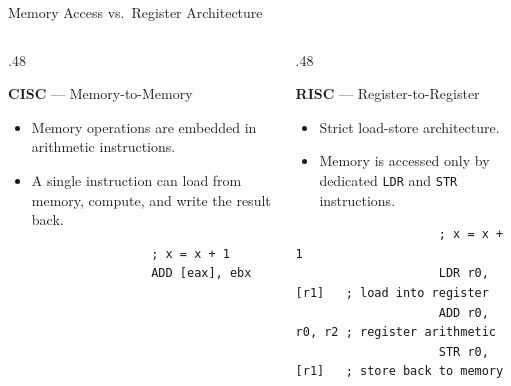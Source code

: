 \documentclass[9pt,aspectratio=169,xcolor=table]{beamer}
\begin{document}
\begin{frame}[fragile]{Memory Access vs.\ Register Architecture}
	\begin{columns}[T]
		\begin{column}{.48\textwidth}
			\begin{minipage}[t][.28\textheight][t]{\linewidth}
				\textbf{CISC} --- Memory-to-Memory
				\begin{itemize}
					\item Memory operations are embedded in arithmetic instructions.
					\item A single instruction can load from memory, compute, and write the result back.
				\end{itemize}
			\end{minipage}

			{\small\color{red!75!black}
				\begin{verbatim}
					; x = x + 1
					ADD [eax], ebx
			\end{verbatim}}
		\end{column}
		\begin{column}{.48\textwidth}
			\begin{minipage}[t][.28\textheight][t]{\linewidth}
				\textbf{RISC} --- Register-to-Register
				\begin{itemize}
					\item Strict load-store architecture.
					\item Memory is accessed only by dedicated \texttt{LDR} and \texttt{STR} instructions.
				\end{itemize}
			\end{minipage}

			{\small\color{red!75!black}
				\begin{verbatim}
					; x = x + 1
					LDR r0, [r1]   ; load into register
					ADD r0, r0, r2 ; register arithmetic
					STR r0, [r1]   ; store back to memory
			\end{verbatim}}
		\end{column}
	\end{columns}
\end{frame}
\end{document}
